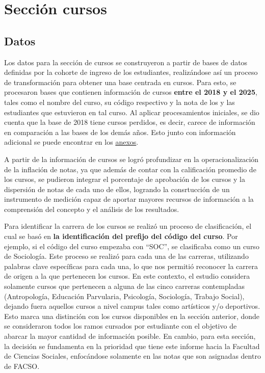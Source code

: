 \documentclass[
  spanish,
  a4paper,
  oneside]{scrbook}
\begin{document}
\section{Sección cursos}\label{secciuxf3n-cursos}

\subsection{Datos}\label{datos-1}

Los datos para la sección de cursos se construyeron a partir de bases de
datos definidas por la cohorte de ingreso de los estudiantes,
realizándose así un proceso de transformación para obtener una base
centrada en cursos. Para esto, se procesaron bases que contienen
información de cursos \textbf{entre el 2018 y el 2025}, tales como el
nombre del curso, su código respectivo y la nota de los y las
estudiantes que estuvieron en tal curso. Al aplicar procesamientos
iniciales, se dio cuenta que la base de 2018 tiene cursos perdidos, es
decir, carece de información en comparación a las bases de los demás
años. Esto junto con información adicional se puede encontrar en los
\href{https://tomasurzuam.github.io/estudio-notas/docs/apendices/C-anexos-cursos.html}{anexos}.

A partir de la información de cursos se logró profundizar en la
operacionalización de la inflación de notas, ya que además de contar con
la calificación promedio de los cursos, se pudieron integrar el
porcentaje de aprobación de los cursos y la dispersión de notas de cada
uno de ellos, logrando la consrtucción de un instrumento de medición
capaz de aportar mayores recursos de información a la comprensión del
concepto y el análisis de los resultados.

Para identificar la carrera de los cursos se realizó un proceso de
clasificación, el cual se basó en \textbf{la identificación del prefijo
del código del curso}. Por ejemplo, si el código del curso empezaba con
``SOC'', se clasificaba como un curso de Sociología. Este proceso se
realizó para cada una de las carreras, utilizando palabras clave
específicas para cada una, lo que nos permitió reconocer la carrera de
origen a la que pertenecen los cursos. En este contexto, el estudio
considera solamente cursos que pertenecen a alguna de las cinco carreras
contempladas (Antropología, Educación Parvularia, Psicología,
Sociología, Trabajo Social), dejando fuera aquellos cursos a nivel
campus tales como artísticos y/o deportivos. Esto marca una distinción
con los cursos disponibles en la sección anterior, donde se consideraron
todos los ramos cursados por estudiante con el objetivo de abarcar la
mayor cantidad de información posible. En cambio, para esta sección, la
decisión se fundamenta en la prioridad que tiene este informe hacia la
Facultad de Ciencias Sociales, enfocándose solamente en las notas que
son asignadas dentro de FACSO.
\end{document}
